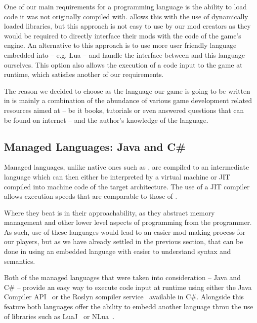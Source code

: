 One of our main requirements for a programming language is the ability to load code it was not originally compiled with. \cpp allows this
with the use of dynamically loaded libraries, but this approach is not easy to use by our mod creators as they would be required to
directly interface their mods with the \cpp code of the game's engine. An alternative to this approach is to use more user friendly
language embedded into \cpp -- e.g. Lua -- and handle the interface between \cpp and this language ourselves. This option also
allows the execution of a code input to the game at runtime, which satisfies another of our requirements.

The reason we decided to choose \cpp as the language our game is going to be written in is mainly a combination of the abundance of
various game development related resources aimed at \cpp -- be it books, tutorials or even answered questions that can be found
on internet -- and the author's knowledge of the language.

\subsection{Managed Languages: Java and C\#}

Managed languages, unlike native ones such as \cpp, are compiled to an intermediate language which can then either
be interpreted by a virtual machine or JIT compiled into machine code of the target architecture. The use
of a JIT compiler allows execution speeds that are comparable to those of \cpp.

Where they beat \cpp is in their approachability, as they abstract memory management and other lower level aspects of programming
from the programmer. As such, use of these languages would lead to an easier mod making process for our players, but as
we have already settled in the previous section, that can be done in \cpp using an embedded language with easier to
understand syntax and semantics.

Both of the managed languages that were taken into consideration -- Java and C\# -- provide an easy way to execute code input
at runtime using either the Java Compiler API~\cite{JavaCompAPI} or the Roslyn sompiler service~\cite{Roslyn} available in C\#.
Alongside this feature both languages offer the ability to embedd another language throu the use of libraries such as
LuaJ~\cite{LuaJ} or NLua~\cite{NLua}.

